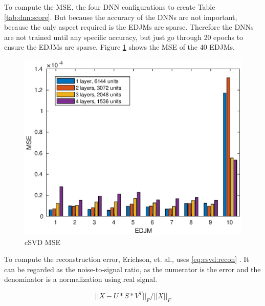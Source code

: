 To compute the MSE, the four DNN configurations to create Table \ref{tab:dnn:score}. But because the accuracy of the DNNs are not important, because the only aspect required is the EDJMs are sparse. Therefore the DNNs are not trained until any specific accuracy, but just go through 20 epochs to ensure the EDJMs are sparse. Figure \ref{fig:csvd:mse} shows the MSE of the 40 EDJMs.
  
\begin{figure}[H]
  \centering
  \includegraphics[scale=0.6]{Figures/csvd_mse.eps}
  \caption{cSVD MSE}
  \label{fig:csvd:mse}
\end{figure}

To compute the reconstruction error, Erichson, et. al., uses \eqref{eq:csvd:recon} \cite{erichson:csvd}. It can be regarded as the noise-to-signal ratio, as the numerator is the error and the denominator is a normalization using real signal.

\begin{equation}
  \label{eq:csvd:recon}
  ||X - U*S*V^T||_F/||X||_F
\end{equation}



